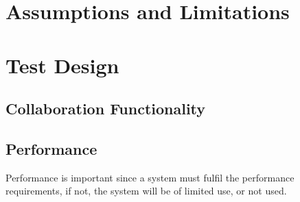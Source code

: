 \section{Assumptions and Limitations}

\section{Test Design}

\subsection{Collaboration Functionality}\label{SS:collaborativeFunctionality}

\subsection{Performance}\label{SS:performance}

Performance is important since a system must fulfil the performance requirements, if not, the system will be of limited use, or not used.